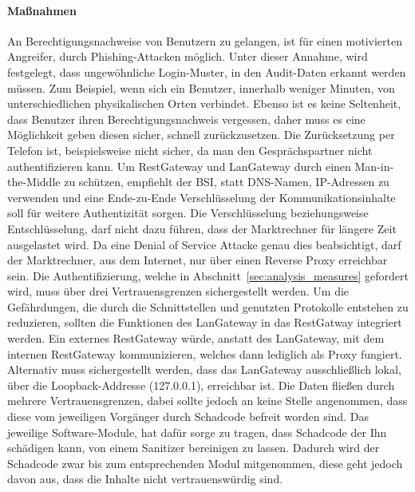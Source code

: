 \documentclass[11pt,a4paper]{report}
\begin{document}
\paragraph{Maßnahmen}

An Berechtigungsnachweise von Benutzern zu gelangen, ist für einen motivierten Angreifer, durch Phishing-Attacken möglich. Unter dieser Annahme, wird festgelegt, dass ungewöhnliche Login-Muster, in den Audit-Daten erkannt werden müssen. Zum Beispiel, wenn sich ein Benutzer, innerhalb weniger Minuten, von unterschiedlichen physikalischen Orten verbindet. Ebenso ist es keine Seltenheit, dass Benutzer ihren Berechtigungsnachweis vergessen, daher muss es eine Möglichkeit geben diesen sicher, schnell zurückzusetzen. Die Zurücksetzung per Telefon ist, beispielsweise nicht sicher, da man den Gesprächspartner nicht authentifizieren kann. Um RestGateway und LanGateway durch einen Man-in-the-Middle zu schützen, empfiehlt der BSI, statt DNS-Namen, IP-Adressen zu verwenden \cite{bsi_m559} und eine Ende-zu-Ende Verschlüsselung der Kommunikationsinhalte soll für weitere Authentizität sorgen. Die Verschlüsselung beziehungsweise Entschlüsselung, darf nicht dazu führen, dass der Marktrechner für längere Zeit ausgelastet wird. Da eine Denial of Service Attacke genau dies beabsichtigt, darf der Marktrechner, aus dem Internet, nur über einen Reverse Proxy erreichbar sein. Die Authentifizierung, welche in Abschnitt~\ref{sec:analysis_measures} gefordert wird, muss über drei Vertrauensgrenzen sichergestellt werden. Um die Gefährdungen, die durch die Schnittstellen und genutzten Protokolle entstehen zu reduzieren, sollten die Funktionen des LanGateway in das RestGatway integriert werden. Ein externes RestGateway würde, anstatt des LanGateway, mit dem internen RestGateway kommunizieren, welches dann lediglich als Proxy fungiert. Alternativ muss sichergestellt werden, dass das LanGateway ausschließlich lokal, über die Loopback-Addresse (127.0.0.1), erreichbar ist. Die Daten fließen durch mehrere Vertrauensgrenzen, dabei sollte jedoch an keine Stelle angenommen, dass diese vom jeweiligen Vorgänger durch Schadcode befreit worden sind. Das jeweilige Software-Module, hat dafür sorge zu tragen, dass Schadcode der Ihn schädigen kann, von einem Sanitizer bereinigen zu lassen. Dadurch wird der Schadcode zwar bis zum entsprechenden Modul mitgenommen, diese geht jedoch davon aus, dass die Inhalte nicht vertrauenswürdig sind.

\end{document}
